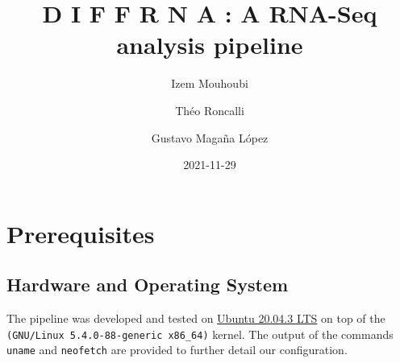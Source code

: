 \documentclass[
  openany]{book}
\title{D I F F R N A : A RNA-Seq analysis pipeline}
\author{Izem Mouhoubi \and Théo Roncalli \and Gustavo Magaña López}
\date{2021-11-29}
\begin{document}
\maketitle

{
\setcounter{tocdepth}{1}
\tableofcontents
}
\hypertarget{prerequisites}{%
\chapter{Prerequisites}\label{prerequisites}}

\hypertarget{hardware-and-operating-system}{%
\section{Hardware and Operating System}\label{hardware-and-operating-system}}

The pipeline was developed and tested on \href{https://fridge.ubuntu.com/2021/08/27/ubuntu-20-04-3-lts-released/}{Ubuntu 20.04.3 LTS}
on top of the \texttt{(GNU/Linux\ 5.4.0-88-generic\ x86\_64)} kernel. The output of the commands \texttt{uname} and \texttt{neofetch} are provided to further detail our configuration.
\end{document}
